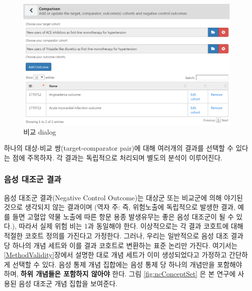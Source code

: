 \documentclass[11pt]{book}
\theoremstyle{definition}
\theoremstyle{definition}
\theoremstyle{definition}
\theoremstyle{remark}
\begin{document}
\begin{figure}

{\centering \includegraphics[width=1\linewidth]{images/PopulationLevelEstimation/comparisons} 

}

\caption{비교 dialog}\label{fig:comparisons}
\end{figure}

하나의 대상-비교 쌍(target-comparator pair)에 대해 여러개의 결과를
선택할 수 있다는 점에 주목하자. 각 결과는 독립적으로 처리되며 별도의
분석이 이루어진다.

\subsubsection*{음성 대조군 결과}\label{--}

음성 대조군 결과(Negative Control Outcome)는 대상군 또는 비교군에 의해
야기된 것으로 생각되지 않는 결과이며 (역자 주: 즉, 위험노출에 독립적으로
발생한 결과, 예를 들면 고혈압 약물 노출에 따른 항문 용종 발생유무는 좋은
음성 대조군이 될 수 있다.), 따라서 실제 위험 비는 1과 동일해야 한다.
이상적으로는 각 결과 코호트에 대해 적절한 코호트 정의를 가진다고
가정한다. 그러나, 우리는 일반적으로 음성 대조 결과 당 하나의 개념 세트와
이를 결과 코호트로 변환하는 표준 논리만 가진다. 여기서는
\ref{MethodValidity}장에서 설명한 대로 개념 세트가 이미 생성되었다고
가정하고 간단하게 선택할 수 있다. 음성 통제 개념 집합에는 음성 통제 당
하나의 개념만을 포함해야 하며, \textbf{하위 개념들은 포함하지 않아야}
한다. 그림 \ref{fig:ncConceptSet} 은 본 연구에 사용된 음성 대조군 개념
집합을 보여준다.
\end{document}
